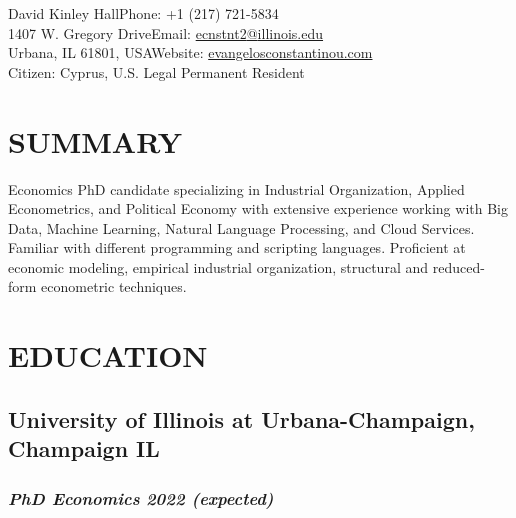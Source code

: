 \documentclass{article}
\makeatletter
\renewcommand{\maketitle}{
        \begin{center}
        {\huge\bfseries\theauthor}

        \vspace{0.25cm}


\noindent 214 David Kinley Hall\hfill Phone: +1 (217) 721-5834\\
1407 W. Gregory Drive\hfill Email: \href{mailto:ecnstnt2@illinois.edu}{ecnstnt2\textrm{@}illinois.edu}\\
Urbana, IL 61801, USA\hfill Website: \href{evangelosconstantinou.com}{evangelosconstantinou.com}\\
\hfill Citizen: Cyprus, U.S. Legal Permanent Resident
        \end{center}
}
\makeatother
\begin{document}
\author{Evangelos Constantinou}



\maketitle
\section{SUMMARY}
\noindent
Economics PhD candidate specializing in Industrial Organization, Applied Econometrics, and Political Economy with extensive experience working with Big Data, Machine Learning, Natural Language Processing, and Cloud Services. Familiar with different programming and scripting languages. Proficient at economic modeling, empirical industrial organization, structural and reduced-form econometric techniques.


\section{EDUCATION}

\subsection{University of Illinois at Urbana-Champaign, Champaign IL}
\subsubsection{\emph{PhD Economics} \hfill \emph{2022 (expected)}}
\end{document}
